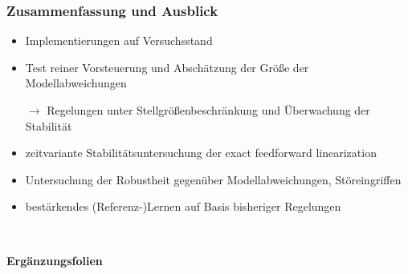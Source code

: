 \documentclass[
	ngerman,
	10pt,				%
	aspectratio=169, 	%
	xcolor=dvipsnames
]{beamer}
\newcommand{\backupbegin}{
   \newcounter{finalframe}
   \setcounter{finalframe}{\value{framenumber}}
}
\begin{document}

\begin{frame}[label=Ausblick]
	\frametitle{Zusammenfassung und Ausblick}
	\begin{itemize}
		\item Implementierungen auf Versuchsstand
		\pause
		\item Test reiner Vorsteuerung und Abschätzung der Größe der Modellabweichungen
		\pause
		\item[$\rightarrow$] Regelungen unter Stellgrößenbeschränkung und Überwachung der Stabilität
		\bigskip
		\pause 
		\item zeitvariante Stabilitätsuntersuchung der exact feedforward linearization
		\pause
		\item Untersuchung der Robustheit gegenüber Modellabweichungen, Störeingriffen
		\bigskip
		\pause
		\item bestärkendes (Referenz-)Lernen auf Basis bisheriger Regelungen
	\end{itemize}
	
\end{frame}


\begin{frame}[fragile,label=Ergaenzungsfolien]{~}
	\begin{center}
		{\huge \textbf{Ergänzungsfolien}} 
	\end{center}
	
\end{frame}

\backupbegin

\end{document}
